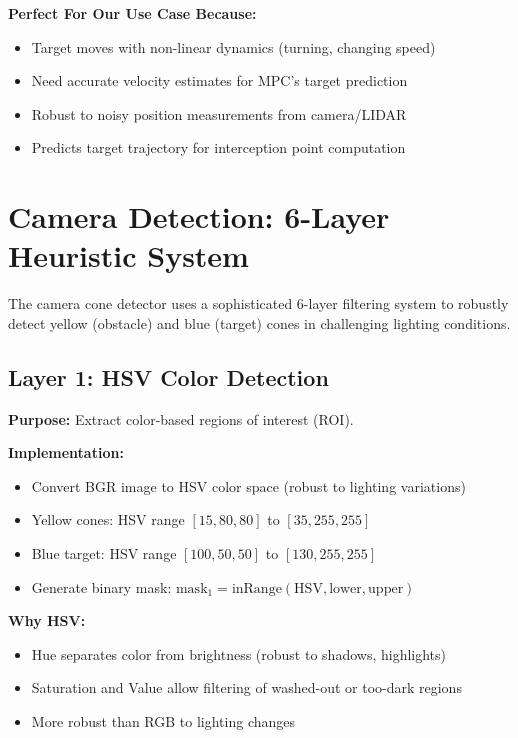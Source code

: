 \documentclass[11pt]{article}
\begin{document}
\textbf{Perfect For Our Use Case Because:}
\begin{itemize}
    \item Target moves with non-linear dynamics (turning, changing speed)
    \item Need accurate velocity estimates for MPC's target prediction
    \item Robust to noisy position measurements from camera/LIDAR
    \item Predicts target trajectory for interception point computation
\end{itemize}

\section{Camera Detection: 6-Layer Heuristic System}

The camera cone detector uses a sophisticated 6-layer filtering system to robustly detect yellow (obstacle) and blue (target) cones in challenging lighting conditions.

\subsection{Layer 1: HSV Color Detection}

\textbf{Purpose:} Extract color-based regions of interest (ROI).

\textbf{Implementation:}
\begin{itemize}
    \item Convert BGR image to HSV color space (robust to lighting variations)
    \item Yellow cones: HSV range $[15, 80, 80]$ to $[35, 255, 255]$
    \item Blue target: HSV range $[100, 50, 50]$ to $[130, 255, 255]$
    \item Generate binary mask: $\text{mask}_1 = \text{inRange}(\text{HSV}, \text{lower}, \text{upper})$
\end{itemize}

\textbf{Why HSV:}
\begin{itemize}
    \item Hue separates color from brightness (robust to shadows, highlights)
    \item Saturation and Value allow filtering of washed-out or too-dark regions
    \item More robust than RGB to lighting changes
\end{itemize}
\end{document}
